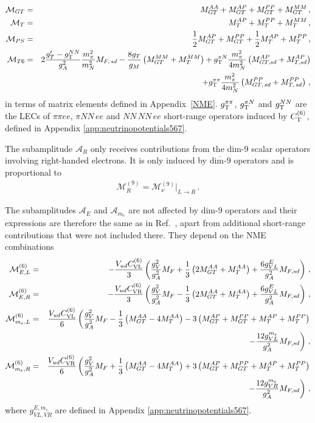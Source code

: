 \documentclass[letterpaper,11pt]{article}
\newcommand{\bea}{\begin{eqnarray}}
\newcommand{\eea}{\end{eqnarray}}
\newcommand{\nn}{\nonumber}
\newcommand{\textoverline}[1]{$\overline{\mbox{#1}}$}
\begin{document}
 \begin{eqnarray}
 \mathcal M_{GT} &=&  M^{AA}_{GT} + M^{AP}_{GT}  +M^{PP}_{GT} + M^{MM}_{GT}\, ,\nn \\
 \mathcal M_{T} &=&  M^{AP}_{T} + M^{PP}_{T}+ M^{MM}_{T}\, ,\nn \\
   \mathcal M_{PS} &=& \frac{1}{2} M^{AP}_{GT} + M^{PP}_{GT}  + \frac{1}{2} M^{AP}_{T} + M^{PP}_{T}\, ,\nn \\
 \mathcal M_{T6} &=& 2 \frac{g^\prime_T  - g^{NN}_{\rm T}}{g_A^2} \frac{m^2_\pi}{m_N^2} M_{F,\, sd}  - \frac{8 g_T}{ g_M} \left( M_{GT}^{MM} + M_T^{MM}\right) 
+ g^{\pi N}_{\rm T} \frac{m_\pi^2}{4m_N^2}    \left(M^{AP}_{GT, sd} + M^{AP}_{T, sd} \right) \nn \\
& &+  g_{ \rm T}^{\pi\pi}\frac{m_\pi^2}{4 m_N^2} \left(  M^{PP}_{GT,\, sd}  + M^{PP}_{T,\, sd} \right)\,,
 \end{eqnarray}
in terms of  matrix elements defined in Appendix~\ref{NME}. 
$g_{\rm T}^{\pi\pi}$, $g_{\rm T}^{\pi N}$ and $g_{\rm T}^{NN}$ are the LECs of  $\pi \pi  ee $, $\pi NN\, ee$ and $NN\, NN\, ee$ short-range operators induced by $C^{(6)}_{\rm T}$,  
defined in Appendix \ref{app:neutrinopotentials567}.  

The subamplitude $\mathcal A_R$ only receives contributions from the dim-9 scalar operators involving right-handed electrons. It is only induced by \textoverline{dim-9} operators and is proportional to 
\bea
  \mathcal M^{(9)}_{R} =  \mathcal M^{(9)}_{\nu}\big |_{L\rightarrow R}\,.
\eea

The subamplitudes $\mathcal A_E$ and $\mathcal A_{m_e}$ are not affected by dim-9 operators and their expressions are therefore the same as in Ref.~\cite{Cirigliano:2017djv}, apart from additional short-range contributions that were not included there. They depend on the NME combinations 
 \begin{eqnarray}
\mathcal M^{(6)}_{E,L} &=&- \frac{V_{ud} C^{(6)}_{\rm VL}}{3}  \left(  \frac{g^2_V}{g_A^2} M_F  + \frac{1}{3} \left( 2 M_{GT}^{AA} + M_T^{AA} \right) +  \frac{6 g_{VL}^{E}}{g_A^2} M_{F,sd} \right) \,,  \\
\mathcal M^{(6)}_{E,R}& =&- \frac{V_{ud} C^{(6)}_{\rm VR}}{3}\left(  \frac{g^2_V}{g_A^2} M_F  - \frac{1}{3} \left( 2 M_{GT}^{AA} + M_T^{AA} \right) +  \frac{6 g_{VL}^{E}}{g_A^2} M_{F,sd} \right) \,, \nn \\
 \mathcal M^{(6)}_{m_e,L} &=&  \frac{V_{ud} C^{(6)}_{\rm VL}}{6}\left(   \frac{g^2_V}{g_A^2} M_F  - \frac{1}{3} \left( M_{GT}^{AA} - 4 M^{AA}_{T}\right) - 3 \left( M^{AP}_{GT} + M^{PP}_{GT} + M^{AP}_{T} + M^{PP}_{T}\right) 
\right. \nn \\ & & \left. - \frac{12g_{VL}^{m_e} }{ g_A^2}  M_{F, sd} 
 \right) \, , \nn \\
 \mathcal M^{(6)}_{m_e,R} &=&  \frac{V_{ud} C^{(6)}_{\rm VR}}{6}\left(   \frac{g^2_V}{g_A^2} M_F  + \frac{1}{3} \left( M_{GT}^{AA} - 4 M^{AA}_{T}\right) +  3 \left( M^{AP}_{GT} + M^{PP}_{GT} + M^{AP}_{T} + M^{PP}_{T}\right)
 \right. \nn \\ & & \left. - \frac{12g_{VR}^{m_e} }{ g_A^2}  M_{F, sd} 
 \right) \, ,\nn
\end{eqnarray}
where $g_{VL,VR}^{E,m_e}$ are defined in Appendix \ref{app:neutrinopotentials567}.
\end{document}
